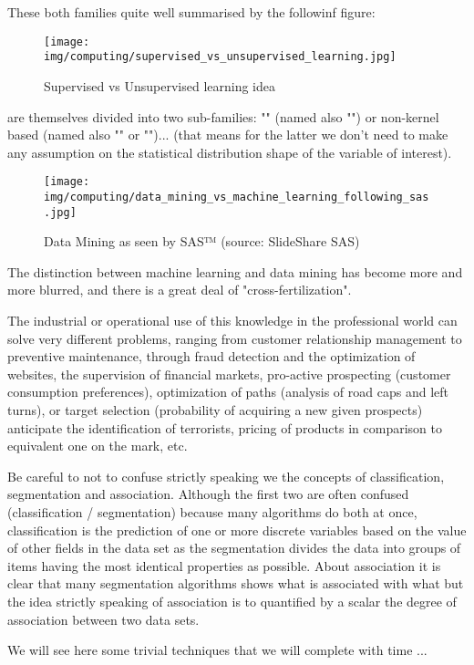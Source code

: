 	These both families  quite well summarised by the followinf figure:
	\begin{figure}[H]
		\centering
		\texttt{[image: img/computing/supervised\_vs\_unsupervised\_learning.jpg]}
		\caption{Supervised vs Unsupervised learning idea}
	\end{figure}
	are themselves divided into two sub-families: "" (named also "") or non-kernel based (named also "" or "")... (that means for the latter we don't need to make any assumption on the statistical distribution shape of the variable of interest).
	\begin{figure}[H]
		\centering
		\texttt{[image: img/computing/data\_mining\_vs\_machine\_learning\_following\_sas.jpg]}
		\caption[Data Mining as seen by SAS™]{Data Mining as seen by SAS™ (source: SlideShare SAS)}
	\end{figure}
	The distinction between machine learning and data mining has become more and more blurred, and there is a great deal of "cross-fertilization".
	
	The industrial or operational use of this knowledge in the professional world can solve very different problems, ranging from customer relationship management to preventive maintenance, through fraud detection and the optimization of websites, the supervision of financial markets, pro-active prospecting (customer consumption preferences), optimization of paths (analysis of road caps and left turns), or target selection (probability of acquiring a new given prospects) anticipate the identification of terrorists, pricing of products in comparison to equivalent one on the mark, etc.
	
	\begin{tcolorbox}[title=Remark,colframe=black,arc=10pt]
	Be careful to not to confuse strictly speaking we the concepts of classification, segmentation and association. Although the first two are often confused (classification / segmentation) because many algorithms do both at once, classification is the prediction of one or more discrete variables based on the value of other fields in the data set as the segmentation divides the data into groups of items having the most identical properties as possible. About association it is clear that many segmentation algorithms shows what is associated with what but the idea strictly speaking of association is to quantified by a scalar the degree of association between two data sets.
	\end{tcolorbox}	
	We will see here some trivial techniques that we will complete with time ...
	
